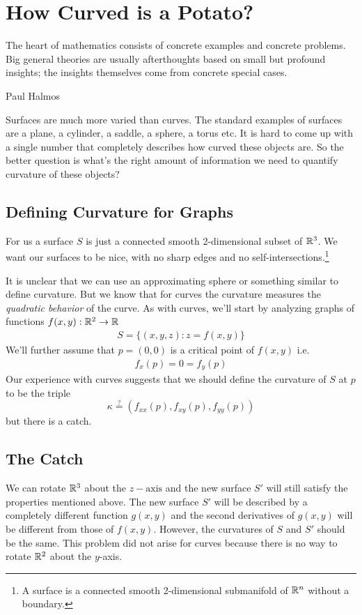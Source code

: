 \section{How Curved is a Potato?}
\epigraph{The heart of mathematics consists of concrete examples and concrete problems. Big general theories are usually afterthoughts based on small but profound insights; the insights themselves come from concrete special cases.}{Paul Halmos}

Surfaces are much more varied than curves. The standard examples of surfaces are a plane, a cylinder, a saddle, a sphere, a torus etc. It is hard to come up with a single number that completely describes how curved these objects are. So the better question is what's the right amount of information we need to quantify curvature of these objects?

\subsection{Defining Curvature for Graphs}
For us a surface $S$ is just a connected smooth 2-dimensional subset of $\mathbb{R}^3$. We want our surfaces to be nice, with no sharp edges and no self-intersections.\footnote{A surface is a connected smooth 2-dimensional submanifold of $ \mathbb{R}^n$ without a boundary.}

It is unclear that we can use an approximating sphere or something similar to define curvature. But we know that for curves the curvature measures the \emph{quadratic behavior} of the curve. As with curves, we'll start by analyzing graphs of functions $f(x,y):\mathbb{R}^2 \rightarrow \mathbb{R}$
\begin{align*}
  S = \{ (x,y,z) : z = f(x,y)\}
\end{align*}
We'll further assume that $p=(0,0)$ is a critical point of $f(x,y)$ i.e.
\begin{align*}
   f_x(p) = 0 = f_y(p)
\end{align*}
Our experience with curves suggests that we should define the curvature of $ S$ at $ p$ to be the triple
$$\kappa \stackrel{?}{=} (f_{xx}(p), f_{xy}(p), f_{yy}(p))$$
but there is a catch.






\subsection{The Catch}
We can rotate $ \mathbb{R}^3$ about the $ z-\mbox{axis}$ and the new surface $ S'$ will still satisfy the properties mentioned above. The new surface $ S'$ will be described by a completely different function $ g(x,y)$ and the second derivatives of $ g(x,y)$ will be different from those of $ f(x,y)$. However, the curvatures of $ S$ and $S'$ should be the same. This problem did not arise for curves because there is no way to {rotate $ \mathbb{R}^2$ about the $ y$-axis}.

